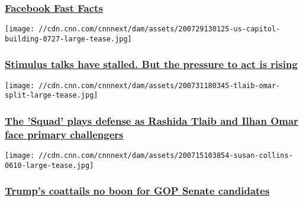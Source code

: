 \hypertarget{facebook-fast-facts}{%
\subsubsection{\texorpdfstring{\href{/2014/02/11/world/facebook-fast-facts/index.html}{Facebook
Fast Facts}}{Facebook Fast Facts}}\label{facebook-fast-facts}}

\href{/2020/08/02/investing/stocks-week-ahead/index.html}{}

\texttt{[image: //cdn.cnn.com/cnnnext/dam/assets/200729130125-us-capitol-building-0727-large-tease.jpg]}

\hypertarget{stimulus-talks-have-stalled-but-the-pressure-to-act-is-rising}{%
\subsubsection{\texorpdfstring{\href{/2020/08/02/investing/stocks-week-ahead/index.html}{Stimulus
talks have stalled. But the pressure to act is
rising}}{Stimulus talks have stalled. But the pressure to act is rising}}\label{stimulus-talks-have-stalled-but-the-pressure-to-act-is-rising}}

\href{/2020/08/02/politics/rashida-tlaib-ilhan-omar-primaries/index.html}{}

\texttt{[image: //cdn.cnn.com/cnnnext/dam/assets/200731180345-tlaib-omar-split-large-tease.jpg]}

\hypertarget{the-squad-plays-defense-as-rashida-tlaib-and-ilhan-omar-face-primary-challengers}{%
\subsubsection{\texorpdfstring{\href{/2020/08/02/politics/rashida-tlaib-ilhan-omar-primaries/index.html}{The
'Squad' plays defense as Rashida Tlaib and Ilhan Omar face primary
challengers}}{The 'Squad' plays defense as Rashida Tlaib and Ilhan Omar face primary challengers}}\label{the-squad-plays-defense-as-rashida-tlaib-and-ilhan-omar-face-primary-challengers}}

\href{/2020/08/02/politics/donald-trump-senate-election/index.html}{}

\texttt{[image: //cdn.cnn.com/cnnnext/dam/assets/200715103854-susan-collins-0610-large-tease.jpg]}

\hypertarget{trumps-coattails-no-boon-for-gop-senate-candidates-}{%
\subsubsection{\texorpdfstring{\href{/2020/08/02/politics/donald-trump-senate-election/index.html}{Trump's
coattails no boon for GOP Senate candidates
}}{Trump's coattails no boon for GOP Senate candidates }}\label{trumps-coattails-no-boon-for-gop-senate-candidates-}}

